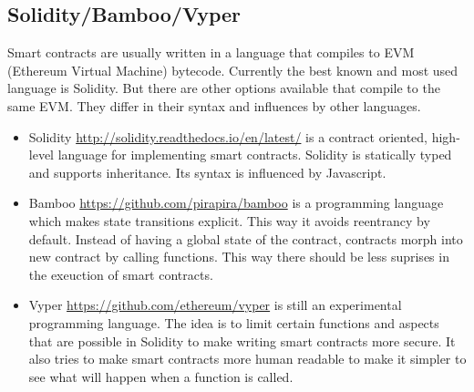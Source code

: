 \documentclass[a4paper]{article}
\begin{document}
\subsection{Solidity/Bamboo/Vyper}
Smart contracts are usually written in a language that compiles to EVM (Ethereum Virtual Machine) bytecode. Currently the best known and most used language is Solidity. But there are other options available that compile to the same EVM. They differ in their syntax and influences by other languages.  
\begin{itemize}
\item Solidity \url{http://solidity.readthedocs.io/en/latest/} is a contract oriented, high-level language for implementing smart contracts. Solidity is statically typed and supports inheritance. Its syntax is influenced by Javascript.
\item Bamboo \url{https://github.com/pirapira/bamboo} is a programming language which makes state transitions explicit. This way it avoids reentrancy by default. Instead of having a global state of the contract, contracts morph into new contract by calling functions. This way there should be less suprises in the exeuction of smart contracts.
\item Vyper \url{https://github.com/ethereum/vyper} is still an experimental programming language. The idea is to limit certain functions and aspects that are possible in Solidity to make writing smart contracts more secure. It also tries to make smart contracts more human readable to make it simpler to see what will happen when a function is called. 
\end{itemize}
\end{document}
